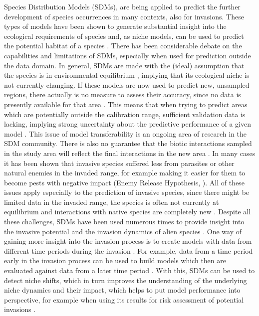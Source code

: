\documentclass[12pt,a4paper]{article}
\begin{document}
Species Distribution Models (SDMs), are being applied to predict the further development of species occurrences in many contexts, also for invasions.
These types of models have been shown to generate substantial insight into the ecological requirements of species and, as niche models, can be used to predict the potential habitat of a species \autocite{araujo2006sdmchallenges}.
There has been considerable debate on the capabilities and limitations of SDMs, especially when used for prediction outside the data domain.
In general, SDMs are made with the (ideal) assumption that the species is in environmental equilibrium \autocite{elith2009sdmtheory}, implying that its ecological niche is not currently changing.
If these models are now used to predict new, unsampled regions, there actually is no measure to assess their accuracy, since no data is presently available for that area \autocite{araujo2006sdmchallenges}.
This means that when trying to predict areas which are potentially outside the calibration range, sufficient validation data is lacking, implying strong uncertainty about the predictive performance of a given model \autocite{araujo2006sdmchallenges}.
This issue of model transferability is an ongoing area of research in the SDM community.
There is also no guarantee that the biotic interactions sampled in the study area will reflect the final interactions in the new area \autocite{elith2009sdmtheory}.
In many cases it has been shown that invasive species suffered less from parasites or other natural enemies in the invaded range, for example making it easier for them to become pests with negative impact (Enemy Release Hypothesis, \autocite{williamson1996bioinvasions}).
All of these issues apply especially to the prediction of invasive species, since there might be limited data in the invaded range, the species is often not currently at equilibrium and interactions with native species are completely new \autocite{mainali2015sdmprojecting}.
Despite all these challenges, SDMs have been used numerous times to provide insight into the invasive potential and the invasion dynamics of alien species \autocite{zimmermann2010sdmtrends}.
One way of gaining more insight into the invasion process is to create models with data from different time periods during the invasion \autocite{briscoe2019palmerisdm}.
For example, data from a time period early in the invasion process can be used to build models which then are evaluated against data from a later time period \autocite{barbet2018nigrithoraxsdm}.
With this, SDMs can be used to detect niche shifts, which in turn improves the understanding of the underlying niche dynamics and their impact, which helps to put model performance into perspective, for example when using its results for risk assessment of potential invasions \autocite{pearman2008nicheSDM}.
\end{document}
